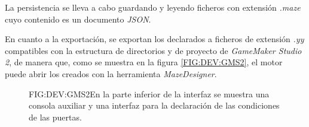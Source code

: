 La persistencia se lleva a cabo guardando y leyendo ficheros con extensión \textit{.maze} cuyo contenido es un documento \textit{JSON}.

En cuanto a la exportación, se exportan los  declarados a ficheros de extensión \textit{.yy} compatibles con la estructura de directorios y de proyecto de \textit{GameMaker Studio 2}, de manera que, como se muestra en la figura \ref{FIG:DEV:GMS2}, el motor puede abrir los  creados con la herramienta \textit{MazeDesigner}.

\begin{figure}{FIG:DEV:GMS2}{En la parte inferior de la interfaz se muestra una consola auxiliar y una interfaz para la declaración de las condiciones de las puertas.}
	 \quad
\end{figure}

\begin{comment}
En esta etapa se han integrado todas las componentes las unas con las otras, dejando componentes vacías que serían sustituídas en la etapa siguiente.

En la interfaz gráfica, se siguieron las maquetas planteadas, dividiendo el área de trabajo en 3 zonas, con tamaños diferentes atendiendo a su función e importancia a la hora de trabajar en el diseño.

Se construyó el sistema de los cambios de contexto mediante el uso de pestañas como elemento gráfico. Los elementos renderizados en el área que se correspondería con el canvas deben gestionar su propia renderización, aunque esta sea dentro de otra componente.

Además de la creación de la propia interfaz gráfica del usuario, se han implementado las acciones generales de la aplicación como el guardar los datos de todos los elementos en un fichero, cargar un diseño desde fichero y la creación de un nuevo diseño sin contenido sobre el que poder trabajar.

Se han proporcionado interfaces de comunicación entre los distintos módulos y componentes gráficas a través del mecanismo de huecos y señales (\textit{slots and signals}) de Qt.

También en esta etapa se ha desarrollado el módulo que se encarga de exportar el diseño al motor \textit{GameMaker Studio 2} para continuar con el desarrollo del juego en esa herramienta.

Finalmente, se han realizado pruebas de consistencia entre las distintas componentes, que involucraban, por ejemplo, que cambios ocasionados en una componente afectaran a otra. Por ejemplo, al eliminar espacio de juego del canvas, si hubiera alguna llave en dicho espacio eliminado, esta tendría que ser eliminada también. Otro ejemplo es que al eliminar un modelo de llave, todas las llaves instanciadas con ese modelo deberían ser eliminadas a su vez.
\end{comment}
